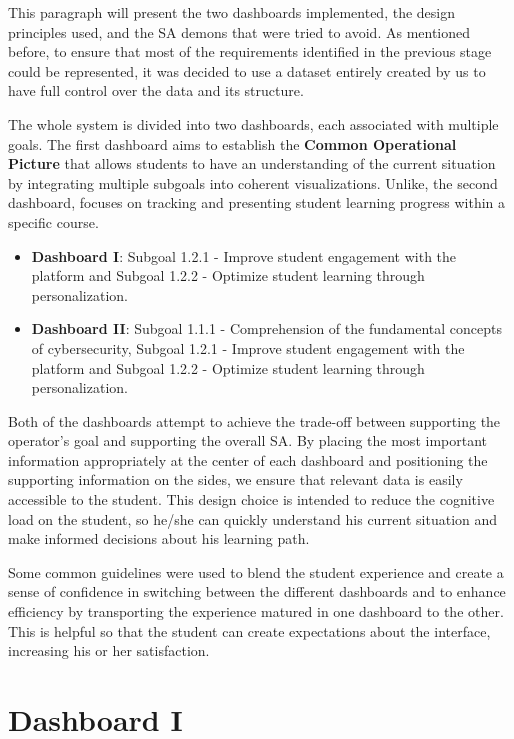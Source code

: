 This paragraph will present the two dashboards implemented, the design principles used, and the SA demons that were tried to avoid. As mentioned before, to ensure that most of the requirements identified in the previous stage could be represented, it was decided to use a dataset entirely created by us to have full control over the data and its structure.

The whole system is divided into two dashboards, each associated with multiple goals. The first dashboard aims to establish the \textbf{Common Operational Picture} that allows students to have an understanding of the current situation by integrating multiple subgoals into coherent visualizations. 
Unlike, the second dashboard, focuses on tracking and presenting student learning progress within a specific course.

\begin{itemize}
    \item \textbf{Dashboard I}: Subgoal 1.2.1 - Improve student engagement with the platform and Subgoal 1.2.2 - Optimize student learning through personalization.
    \item \textbf{Dashboard II}: Subgoal 1.1.1 - Comprehension of the fundamental concepts of cybersecurity, Subgoal 1.2.1 - Improve student engagement with the platform and Subgoal 1.2.2 - Optimize student learning through personalization.
\end{itemize} 

Both of the dashboards attempt to achieve the trade-off between supporting the operator's goal and supporting the overall SA. By placing the most important information appropriately at the center of each dashboard and positioning the supporting information on the sides, we ensure that relevant data is easily accessible to the student. This design choice is intended to reduce the cognitive load on the student, so he/she can quickly understand his current situation and make informed decisions about his learning path.

Some common guidelines were used to blend the student experience and create a sense of confidence in switching between the different dashboards and to enhance efficiency by transporting the experience matured in one dashboard to the other. This is helpful so that the student can create expectations about the interface, increasing his or her satisfaction.

\section{Dashboard I}

